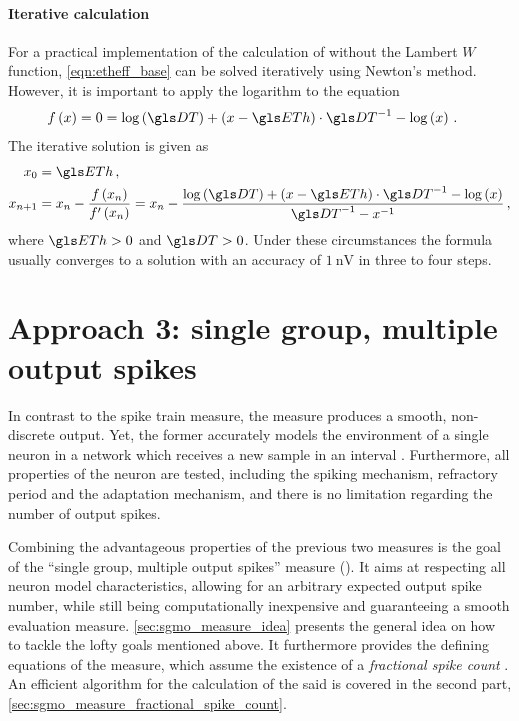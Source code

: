\paragraph{Iterative calculation}
For a practical implementation of the calculation of \EThEff without the Lambert $W$ function, \cref{eqn:etheff_base} can be solved iteratively using Newton's method. However, it is important to apply the logarithm to the equation
\begin{align}
	f \left(x\right) = 0 &= \log\left(\DT\right) + (x - \ETh) \cdot \DT^{-1} - \log\left(x\right) \,.
\end{align}
The iterative solution is given as
\begin{align}
	x_0 &= \ETh \,,\\
	x_{n + 1} &= x_{n} - \frac{f\left(x_{n}\right)}{f'\left(x_{n}\right)}
		= x_{n} -
			\frac{\log\left(\DT\right) + (x - \ETh) \cdot \DT^{-1} - \log\left(x\right)}
			{\DT^{-1} - x^{-1}}\notag\,,
\end{align}
where $\ETh > 0$ and $\DT > 0$. Under these circumstances the formula usually converges to a solution with an accuracy of $\SI{1}{\nano\volt}$ in three to four steps.

\section{Approach 3: single group, multiple output spikes}
\label{sec:sgmo_measure}

In contrast to the spike train measure, the \SGSO measure produces a smooth, non-discrete output. Yet, the former accurately models the environment of a single neuron in a \BiNAM network which receives a new sample in an interval \timeWindow. Furthermore, all properties of the neuron are tested, including the spiking mechanism, refractory period and the adaptation mechanism, and there is no limitation regarding the number of output spikes.

Combining the advantageous properties of the previous two measures is the goal of the \enquote{single group, multiple output spikes} measure (\SGMO). It aims at respecting all neuron model characteristics, allowing for an arbitrary expected output spike number, while still being computationally inexpensive and guaranteeing a smooth evaluation measure. \cref{sec:sgmo_measure_idea} presents the general idea on how to tackle the lofty goals mentioned above. It furthermore provides the defining equations of the measure, which assume the existence of a \emph{fractional spike count} \qOutA. An efficient algorithm for the calculation of the said \qOutA is covered in the second part, \cref{sec:sgmo_measure_fractional_spike_count}.

